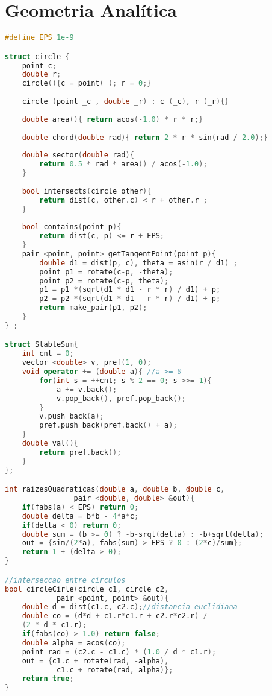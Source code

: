 \section{Geometria Analítica}
\begin{lstlisting}[language=C++]
#define EPS 1e-9

struct circle {
    point c;
    double r;
    circle(){c = point( ); r = 0;}
    
    circle (point _c , double _r) : c (_c), r (_r){}
    
    double area(){ return acos(-1.0) * r * r;}
    
    double chord(double rad){ return 2 * r * sin(rad / 2.0);}
    
    double sector(double rad){ 
    	return 0.5 * rad * area() / acos(-1.0);
    }
    
    bool intersects(circle other){
    	return dist(c, other.c) < r + other.r ;
    }
    
    bool contains(point p){
    	return dist(c, p) <= r + EPS;
    }
    pair <point, point> getTangentPoint(point p){
        double d1 = dist(p, c), theta = asin(r / d1) ;
        point p1 = rotate(c-p, -theta);
        point p2 = rotate(c-p, theta);
        p1 = p1 *(sqrt(d1 * d1 - r * r) / d1) + p;
        p2 = p2 *(sqrt(d1 * d1 - r * r) / d1) + p;
        return make_pair(p1, p2);
  	}
} ;

struct StableSum{
	int cnt = 0;
    vector <double> v, pref(1, 0);
    void operator += (double a){ //a >= 0
    	for(int s = ++cnt; s % 2 == 0; s >>= 1){
        	a += v.back();
            v.pop_back(), pref.pop_back();
        }
        v.push_back(a);
        pref.push_back(pref.back() + a);
    }
    double val(){
    	return pref.back();
    }
};

int raizesQuadraticas(double a, double b, double c,
				pair <double, double> &out){
	if(fabs(a) < EPS) return 0;
    double delta = b*b - 4*a*c;
    if(delta < 0) return 0;
    double sum = (b >= 0) ? -b-srqt(delta) : -b+sqrt(delta);
    out = {sim/(2*a), fabs(sum) > EPS ? 0 : (2*c)/sum};
    return 1 + (delta > 0);
}

//interseccao entre circulos
bool circleCirle(circle c1, circle c2,
			pair <point, point> &out){
	double d = dist(c1.c, c2.c);//distancia euclidiana
    double co = (d*d + c1.r*c1.r + c2.r*c2.r) /
    (2 * d * c1.r);
    if(fabs(co) > 1.0) return false;
    double alpha = acos(co);
    point rad = (c2.c - c1.c) * (1.0 / d * c1.r);
    out = {c1.c + rotate(rad, -alpha),
    		c1.c + rotate(rad, alpha)};
    return true;
}
\end{lstlisting}

